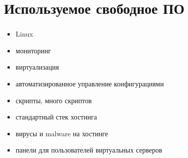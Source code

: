 
\section{Используемое свободное ПО}

\begin{frame}
\frametitle{\insertsection}
\begin{itemize}
	\item Linux
	\item мониторинг
	\item виртуализация
	\item автоматизированное управление конфигурациями
	\item скрипты, много скриптов
	\item стандартный стек хостинга
	\item вирусы и malware на хостинге
	\item панели для пользователей виртуальных серверов
\end{itemize}
\end{frame}

\iffalse
\section{Свободное ПО}

\begin{frame}
\frametitle{\insertsection}
\begin{enumerate}
	\item Элемент 1
	\uncover<2->{\item Элемент 2}
	\uncover<3->{\item Элемент 3*}
\end{enumerate}
\begin{figure}[h]
	\begin{center}
		\begin{multicols}{2}
		\texttt{[image: one]} \pause \\
		\uncover<2->{\texttt{[image: two]}} \pause \\
		\end{multicols}
		\uncover<3->{\texttt{[image: three]}}
	 \end{center}
\end{figure}
\vfill
\footnotesize{* Какая-то сноска}
\end{frame}
\fi

